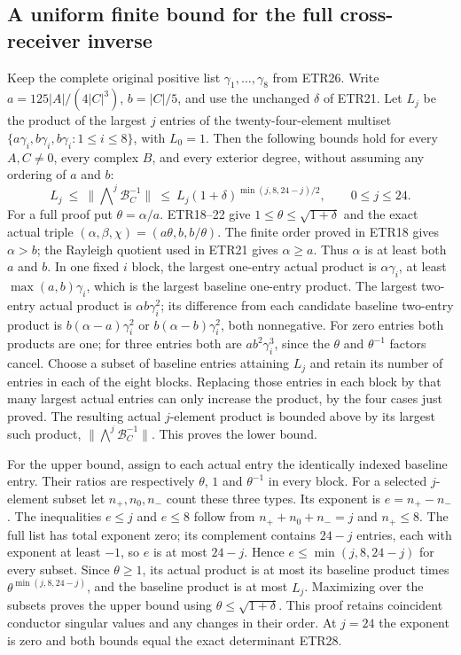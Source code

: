 \subsection{A uniform finite bound for the full cross-receiver inverse}
Keep the complete original positive list $\gamma_1,\ldots,\gamma_8$
from ETR26. Write $a=125|A|/(4|C|^3)$, $b=|C|/5$, and use the
unchanged $\delta$ of ETR21. Let $L_j$ be the product of the largest
$j$ entries of the twenty-four-element multiset
$\{a\gamma_i,b\gamma_i,b\gamma_i:1\le i\le8\}$, with $L_0=1$.
Then the following bounds hold for every $A,C\ne0$, every complex
$B$, and every exterior degree, without assuming any ordering of
$a$ and $b$:
\[
 L_j\ \le\ \|\mathop{\bigwedge}\nolimits^j\mathcal B_C^{-1}\|
       \ \le\ L_j(1+\delta)^{\min(j,8,24-j)/2},
       \qquad 0\le j\le24.                              \tag{ETR31}
\]
For a full proof put $\theta=\alpha/a$. ETR18--22 give
$1\le\theta\le\sqrt{1+\delta}$ and the exact actual triple
$(\alpha,\beta,\chi)=(a\theta,b,b/\theta)$.
The finite order proved in ETR18 gives $\alpha>b$; the Rayleigh
quotient used in ETR21 gives $\alpha\ge a$. Thus $\alpha$ is at
least both $a$ and $b$. In one fixed $i$ block, the largest one-entry
actual product is $\alpha\gamma_i$, at least
$\max(a,b)\gamma_i$, which is the largest baseline one-entry
product. The largest two-entry actual product is $\alpha b\gamma_i^2$;
its difference from each candidate baseline two-entry product is
$b(\alpha-a)\gamma_i^2$ or $b(\alpha-b)\gamma_i^2$, both nonnegative.
For zero entries both products are one; for three entries both are
$ab^2\gamma_i^3$, since the $\theta$ and $\theta^{-1}$ factors cancel.
Choose a subset of baseline entries attaining $L_j$ and retain its
number of entries in each of the eight blocks. Replacing those entries
in each block by that many largest actual entries can only increase
the product, by the four cases just proved. The resulting actual
$j$-element product is bounded above by its largest such product,
$\|\bigwedge^j\mathcal B_C^{-1}\|$. This proves the lower bound.

For the upper bound, assign to each actual entry the identically
indexed baseline entry. Their ratios are respectively $\theta$, $1$
and $\theta^{-1}$ in every block. For a selected $j$-element subset
let $n_+,n_0,n_-$ count these three types. Its exponent is
$e=n_+-n_-$. The inequalities $e\le j$ and $e\le8$ follow from
$n_++n_0+n_-=j$ and $n_+\le8$. The full list has total exponent zero;
its complement contains $24-j$ entries, each with exponent at least
$-1$, so $e$ is at most $24-j$. Hence
$e\le\min(j,8,24-j)$ for every subset. Since $\theta\ge1$, its
actual product is at most its baseline product times
$\theta^{\min(j,8,24-j)}$, and the baseline product is at most
$L_j$. Maximizing over the subsets proves the upper bound using
$\theta\le\sqrt{1+\delta}$. This proof retains coincident conductor
singular values and any changes in their order. At $j=24$ the exponent
is zero and both bounds equal the exact determinant ETR28.
